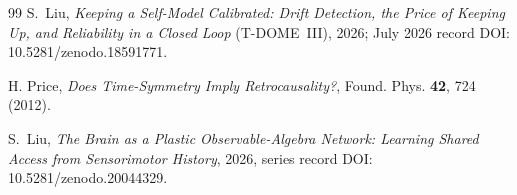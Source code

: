 \documentclass[12pt,a4paper]{article}
\begin{document}
\begin{thebibliography}{99}
S.~Liu, \emph{Keeping a Self-Model Calibrated: Drift Detection, the Price of Keeping Up, and Reliability in a Closed Loop} (T-DOME~III), 2026; July 2026 record DOI: 10.5281/zenodo.18591771.

H. Price, \emph{Does Time-Symmetry Imply Retrocausality?}, Found. Phys. \textbf{42}, 724 (2012).

S.~Liu, \emph{The Brain as a Plastic Observable-Algebra Network:
Learning Shared Access from Sensorimotor History}, 2026, series record DOI: 10.5281/zenodo.20044329.

\end{thebibliography}
\end{document}
